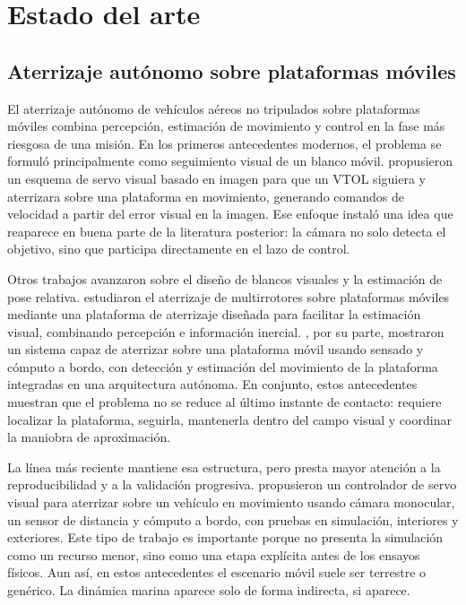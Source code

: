 \documentclass[12pt,a4paper]{report}
\begin{document}
\section{Estado del arte} \label{sec:estado_arte}

\subsection{Aterrizaje autónomo sobre plataformas móviles}

El aterrizaje autónomo de vehículos aéreos no tripulados sobre plataformas
móviles combina percepción, estimación de movimiento y control en la fase más
riesgosa de una misión. En los primeros antecedentes modernos, el problema se
formuló principalmente como seguimiento visual de un blanco móvil.
\citet{Lee2012} propusieron un esquema de servo visual basado en imagen para que
un VTOL siguiera y aterrizara sobre una plataforma en movimiento, generando comandos de
velocidad a partir del error visual en la imagen. Ese enfoque
instaló una idea que reaparece en buena parte de la literatura posterior: la
cámara no solo detecta el objetivo, sino que participa directamente en el lazo
de control.

Otros trabajos avanzaron sobre el diseño de blancos visuales y la estimación de
pose relativa. \citet{Araar2017} estudiaron el aterrizaje de multirrotores
sobre plataformas móviles mediante una plataforma de aterrizaje diseñada para
facilitar la estimación visual, combinando percepción e información inercial.
\citet{Falanga2017}, por su parte, mostraron un sistema capaz de aterrizar sobre
una plataforma móvil usando sensado y cómputo a bordo, con detección y
estimación del movimiento de la plataforma integradas en una arquitectura
autónoma. En conjunto, estos antecedentes
muestran que el problema no se reduce al último instante de contacto: requiere
localizar la plataforma, seguirla, mantenerla dentro del campo visual y
coordinar la maniobra de aproximación.

La línea más reciente mantiene esa estructura, pero presta mayor atención a la
reproducibilidad y a la validación progresiva. \citet{Keipour2022}
propusieron un controlador de servo visual para aterrizar sobre un vehículo en
movimiento usando cámara monocular, un sensor de distancia y cómputo a bordo,
con pruebas en simulación, interiores y exteriores. Este
tipo de trabajo es importante porque no presenta la simulación como un recurso
menor, sino como una etapa explícita antes de los ensayos físicos. Aun así, en
estos antecedentes el escenario móvil suele ser terrestre o genérico. La
dinámica marina aparece solo de forma indirecta, si aparece.
\end{document}
